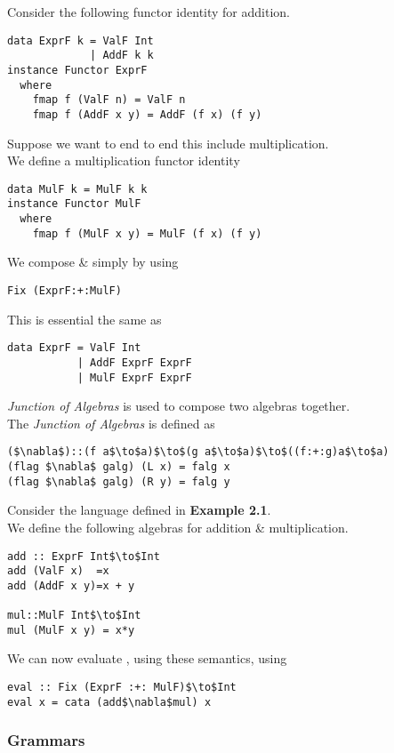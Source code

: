 \documentclass[11pt,a4paper]{article}
\begin{document}
Consider the following functor identity for addition.
\begin{lstlisting}
data ExprF k = ValF Int
             | AddF k k
instance Functor ExprF
  where
    fmap f (ValF n) = ValF n
    fmap f (AddF x y) = AddF (f x) (f y)
\end{lstlisting}
Suppose we want to end to end this include multiplication.\\
We define a multiplication functor identity
\begin{lstlisting}
data MulF k = MulF k k
instance Functor MulF
  where
    fmap f (MulF x y) = MulF (f x) (f y)
\end{lstlisting}
We compose {} \& {} simply by using
\begin{lstlisting}
Fix (ExprF:+:MulF)
\end{lstlisting}
This is essential the same as
\begin{lstlisting}
data ExprF = ValF Int
           | AddF ExprF ExprF
           | MulF ExprF ExprF
\end{lstlisting}

\textit{Junction of Algebras} is used to compose two algebras together.\\
The \textit{Junction of Algebras} is defined as
\begin{lstlisting}
($\nabla$)::(f a$\to$a)$\to$(g a$\to$a)$\to$((f:+:g)a$\to$a)
(flag $\nabla$ galg) (L x) = falg x
(flag $\nabla$ galg) (R y) = falg y
\end{lstlisting}

Consider the language defined in \textbf{Example 2.1}.\\
We define the following algebras for addition \& multiplication.\\
\begin{lstlisting}
add :: ExprF Int$\to$Int
add (ValF x)  =x
add (AddF x y)=x + y

mul::MulF Int$\to$Int
mul (MulF x y) = x*y
\end{lstlisting}
We can now evaluate {}, using these semantics, using
\begin{lstlisting}
eval :: Fix (ExprF :+: MulF)$\to$Int
eval x = cata (add$\nabla$mul) x
\end{lstlisting}

\subsubsection{Grammars}
\end{document}
